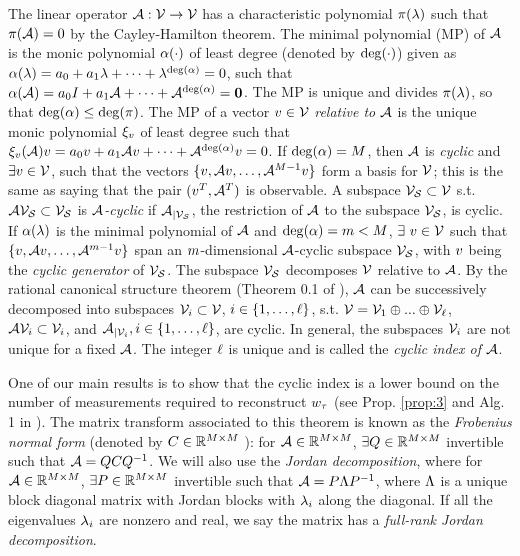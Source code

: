 The linear operator $\mathcal{A}:\mathcal{V}\rightarrow\mathcal{V}$ has a characteristic polynomial $\pi(\lambda) $ such that $\pi(\mathcal{A})=0 $ by the Cayley-Hamilton theorem. The minimal polynomial (MP) of $\mathcal{A}$ is the monic polynomial $\alpha(\cdot)$ of least degree (denoted by $\operatorname{deg}(\cdot)$) given as 
$\alpha(\lambda) = a_0 + a_1\lambda +\cdots + \lambda^{\operatorname{deg}(\alpha)} = 0$, such that
$\alpha(\mathcal{A})=a_0 I + a_1\mathcal{A} +\cdots + \mathcal{A}^{\operatorname{deg}(\alpha)} = \bm{0}$. 
The MP is unique and divides $\pi(\lambda)$, so that $ \operatorname{deg}(\alpha) \leq \operatorname{deg}(\pi)$. The MP of a vector $v\in\mathcal{V}$ \emph{relative to $\mathcal{A}$} is the unique monic polynomial $\xi_{v}$ of least degree such that 
$\xi_{v}(\mathcal{A})v= a_0v + a_1\mathcal{A}v + \cdots + \mathcal{A}^{\operatorname{deg}(\alpha)}v = 0$. 
If $\operatorname{deg}(\alpha) = M$, then $\mathcal{A}$ is \emph{cyclic} and $\exists v\in \mathcal{V}$, such that the vectors $\{v, \mathcal{A} v,\dots,\mathcal{A}^{M-1}v\}$ form a basis for $\mathcal{V}$; this is the same as saying that the pair $(v^T,\mathcal{A}^T)$ is observable.    
A subspace $\mathcal{V}_{\mathcal{S}}\subset\mathcal{V}$ s.t. $\mathcal{A}\mathcal{V}_{\mathcal{S}}\subset\mathcal{V}_{\mathcal{S}}$ is \emph{$\mathcal{A}$-cyclic} if  ${\mathcal{A}}_{|\mathcal{V}_{\mathcal{S}}}$, the restriction of $\mathcal{A}$ to the subspace $\mathcal{V}_{\mathcal{S}}$, is cyclic. If $\alpha(\lambda)$ is the minimal polynomial of $\mathcal{A}$ and $\operatorname{deg}(\alpha) = m < M$, $\exists~v\in\mathcal{V}$ such that $\{v, \mathcal{A} v,\dots,\mathcal{A}^{m-1}v\}$ span an $m$-dimensional $\mathcal{A}$-cyclic subspace $\mathcal{V}_{\mathcal{S}}$, with $v$ being the \emph{cyclic generator} of $\mathcal{V}_{\mathcal{S}}$.  The subspace $\mathcal{V}_{\mathcal{S}}$ decomposes $\mathcal{V}$ relative to $\mathcal{A}$. By the rational canonical structure theorem (Theorem 0.1 of \cite{wonham1974linear}), $\mathcal{A}$ can be successively decomposed into subspaces $\mathcal{V}_i \subset \mathcal{V}$, $i\in \{1,\dots,\ell\}$, s.t. $\mathcal{V} = \mathcal{V}_1 \oplus ... \oplus \mathcal{V}_{\ell}$, $\mathcal{A}\mathcal{V}_i \subset \mathcal{V}_i$, and  $\mathcal{A}_{|\mathcal{V}_i}, i \in \{1,\dots,\ell\}$, are cyclic. In general, the subspaces $\mathcal{V}_i$ are not unique for a fixed $\mathcal{A}$. The integer $\ell$ is unique and is called the \emph{cyclic index of $\mathcal{A}$}. 

One of our main results is to show that the cyclic index is a lower bound on the number of measurements required to reconstruct $w_{\tau}$ (see Prop. \ref{prop:3} and Alg. 1 in \cite{Kingravi16_NIPS}). The matrix transform associated to this theorem is known as the \emph{Frobenius normal form} (denoted by $C\in\mathbb{R}^{M\times M}$ ): for $\mathcal{A}\in\mathbb{R}^{M\times M}$,  $\exists Q\in\mathbb{R}^{M\times M}$ invertible  such that $\mathcal{A} = QCQ^{-1}$. We will also use the \emph{Jordan decomposition}, where for $\mathcal{A}\in\mathbb{R}^{M\times M}$, $\exists P\in\mathbb{R}^{M\times M}$ invertible such that $\mathcal{A} = P\Lambda P^{-1}$, where $\Lambda$ is a unique block diagonal matrix with Jordan blocks with $\lambda_i$ along the diagonal. 
If all the eigenvalues $\lambda_i$ are nonzero and real, we say the matrix has a \emph{full-rank Jordan decomposition}. 

